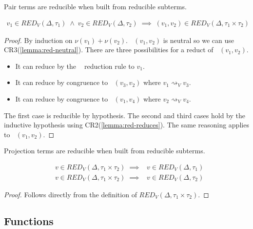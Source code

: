 \documentclass[acmsmall, screen, review, anonymous]{acmart}
\theoremstyle{definition}
\newcommand{\fstname}{\mathop{\pi_1}}
\newcommand{\fst}[1]{\fstname #1}
\newcommand{\sndname}{\mathop{\pi_2}}
\newcommand{\snd}[1]{\sndname #1}
\newcommand{\stepstoname}{\rightsquigarrow}
\newcommand{\stepstov}{\stepstoname_V}
\newcommand{\bound}[1]{\nu(#1)}
\newcommand{\redname}{RED}
\newcommand{\redvname}{\redname_{V}}
\newcommand{\redv}[2]{\redvname{({#1},{#2})}}
\begin{document}
Pair terms are reducible when built from reducible subterms.
\begin{lemma}
\label{lemma:red-pair}
\begin{align*}
  v_1 \in \redv{\Delta}{\tau_1} \; \wedge \; v_2 \in \redv{\Delta}{\tau_2}
  \; \implies \; (v_1, v_2) \in \redv{\Delta}{\tau_1 \times \tau_2}
\end{align*}
\end{lemma}
\begin{proof}
  By induction on $\bound{v_1} + \bound{v_2}$.  $\fst{(v_1, v_2)}$ is
  neutral so we can use CR3(\ref{lemma:red-neutral}). There are three
  possibilities for a reduct of $\fst{(v_1, v_2)}$.
  \begin{itemize}
  \item It can reduce by the $\fstname$ reduction rule to $v_1$.
  \item It can reduce by congruence to $\fst{(v_3, v_2)}$ where $v_1 \stepstov v_3$.
  \item It can reduce by congruence to $\fst{(v_1, v_4)}$ where $v_2 \stepstov v_4$.
  \end{itemize}
  The first case is reducible by hypothesis. The second and third cases
  hold by the inductive hypothesis using
  CR2(\ref{lemma:red-reduces}). The same reasoning applies to
  $\snd{(v_1, v_2)}$.
\end{proof}

Projection terms are reducible when built from reducible subterms.
\begin{lemma}
\label{lemma:red-proj}
\begin{align*}
  &v \in \redv{\Delta}{\tau_1 \times \tau_2} \; \implies \; \fst{v} \in \redv{\Delta}{\tau_1} \\
  &v \in \redv{\Delta}{\tau_1 \times \tau_2} \; \implies \; \snd{v} \in \redv{\Delta}{\tau_2}
\end{align*}
\end{lemma}
\begin{proof}
  Follows directly from the definition of $\redv{\Delta}{\tau_1 \times \tau_2}$.
\end{proof}

\subsection{Functions}
\end{document}
